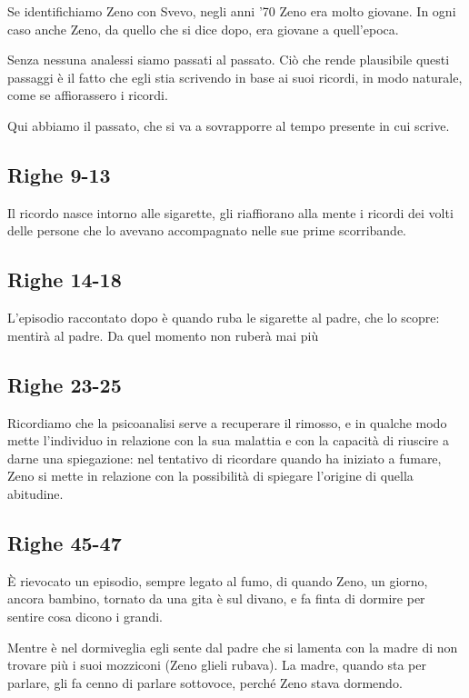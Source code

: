 \documentclass[a4paper, twoside, titlepage]{book}
\begin{document}
Se identifichiamo Zeno con Svevo, negli anni '70 Zeno era molto giovane. In ogni caso anche Zeno, da quello che si dice dopo, era giovane a quell'epoca.

Senza nessuna analessi siamo passati al passato. Ciò che rende plausibile questi passaggi è il fatto che egli stia scrivendo in base ai suoi ricordi, in modo naturale, come se affiorassero i ricordi.

Qui abbiamo il passato, che si va a sovrapporre al tempo presente in cui scrive.

\subsection*{Righe 9-13}

Il ricordo nasce intorno alle sigarette, gli riaffiorano alla mente i ricordi dei volti delle persone che lo avevano accompagnato nelle sue prime scorribande.

\subsection*{Righe 14-18}

L'episodio raccontato dopo è quando ruba le sigarette al padre, che lo scopre: mentirà al padre. Da quel momento non ruberà mai più

\subsection*{Righe 23-25}

Ricordiamo che la psicoanalisi serve a recuperare il rimosso, e in qualche modo mette l'individuo in relazione con la sua malattia e con la capacità di riuscire a darne una spiegazione: nel tentativo di ricordare quando ha iniziato a fumare, Zeno si mette in relazione con la possibilità di spiegare l'origine di quella abitudine.

\subsection*{Righe 45-47}

È rievocato un episodio, sempre legato al fumo, di quando Zeno, un giorno, ancora bambino, tornato da una gita è sul divano, e fa finta di dormire per sentire cosa dicono i grandi.

Mentre è nel dormiveglia egli sente dal padre che si lamenta con la madre di non trovare più i suoi mozziconi (Zeno glieli rubava). La madre, quando sta per parlare, gli fa cenno di parlare sottovoce, perché Zeno stava dormendo.
\end{document}
